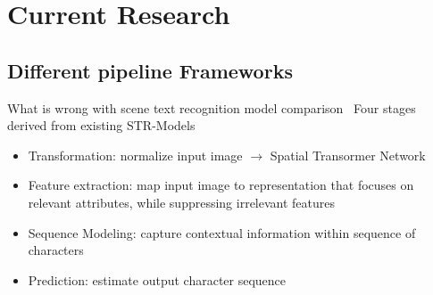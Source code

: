 \chapter{Current Research}\label{ch:research}
\section{Different pipeline Frameworks}
What is wrong with scene text recognition model comparison~\cite{baek_what_2019}
Four stages derived from existing STR-Models
\begin{itemize}
    \item Transformation: normalize input image $\rightarrow$ Spatial Transormer Network
    \item Feature extraction: map input image to representation that focuses on relevant attributes,
        while suppressing irrelevant features
    \item Sequence Modeling: capture contextual information within sequence of characters
    \item Prediction: estimate output character sequence
\end{itemize}

